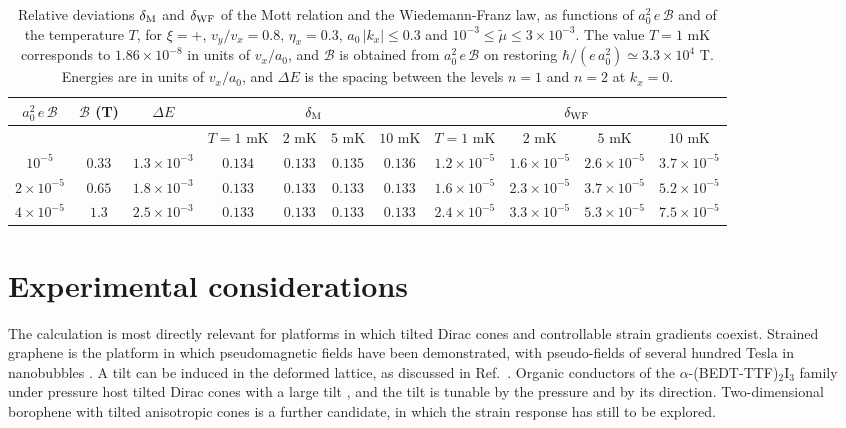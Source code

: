 \documentclass[aps,prb, onecolumn, nofootinbib, citeautoscript,10pt]{revtex4-2}
\begin{document}
\begin{table}[t!]
\centering
\small
\renewcommand{\arraystretch}{1.4}

\begin{tabular}{|c|c|c|c|c|c|c|c|c|c|c|}
\hline
$a_0^2\,e\,\mathcal B$ & $\mathcal B$ (T) & $\Delta E$ & \multicolumn{4}{c|}{$\delta_{\rm M}$} & \multicolumn{4}{c|}{$\delta_{\rm WF}$} \\
\hline
 &  &  & $T=1$ mK & $2$ mK & $5$ mK & $10$ mK & $T=1$ mK & $2$ mK & $5$ mK & $10$ mK \\
\hline
$10^{-5}$ & $0.33$ & $1.3\times10^{-3}$ & $0.134$ & $0.133$ & $0.135$ & $0.136$ & $1.2\times10^{-5}$ & $1.6\times10^{-5}$ & $2.6\times10^{-5}$ & $3.7\times10^{-5}$ \\
\hline
$2\times10^{-5}$ & $0.65$ & $1.8\times10^{-3}$ & $0.133$ & $0.133$ & $0.133$ & $0.133$ & $1.6\times10^{-5}$ & $2.3\times10^{-5}$ & $3.7\times10^{-5}$ & $5.2\times10^{-5}$ \\
\hline
$4\times10^{-5}$ & $1.3$ & $2.5\times10^{-3}$ & $0.133$ & $0.133$ & $0.133$ & $0.133$ & $2.4\times10^{-5}$ & $3.3\times10^{-5}$ & $5.3\times10^{-5}$ & $7.5\times10^{-5}$ \\
\hline
\end{tabular}
\caption{Relative deviations $\delta_{\rm M}$ and $\delta_{\rm WF}$ of the Mott relation and the Wiedemann-Franz law, as functions of $a_0^2\,e\,\mathcal B$ and of the temperature $T$, for $\xi=+$, $v_y/v_x=0.8$, $\eta_x=0.3$, $a_0\,|k_x|\le0.3$ and $10^{-3}\le\tilde\mu\le3\times10^{-3}$. The value $T=1$ mK corresponds to $1.86\times10^{-8}$ in units of $v_x/a_0$, and $\mathcal B$ is obtained from $a_0^2\,e\,\mathcal B$ on restoring $\hbar/(e\,a_0^2)\simeq3.3\times10^{4}$ T. Energies are in units of $v_x/a_0$, and $\Delta E$ is the spacing between the levels $n=1$ and $n=2$ at $k_x=0$.\label{tabdev}}
\end{table}







\section{Experimental considerations}
\label{secexp}

The calculation is most directly relevant for platforms in which tilted Dirac cones and controllable strain gradients coexist. Strained graphene is the platform in which pseudomagnetic fields have been demonstrated, with pseudo-fields of several hundred Tesla in nanobubbles \cite{levy10, graphene-strain-geim, vozmediano10, strain-2d}. A tilt can be induced in the deformed lattice, as discussed in Ref.~\cite{tilted-goerbig}. Organic conductors of the $\alpha$-(BEDT-TTF)$_2$I$_3$ family under pressure host tilted Dirac cones with a large tilt \cite{organic-tilted-dirac}, and the tilt is tunable by the pressure and by its direction. Two-dimensional borophene with tilted anisotropic cones \cite{zhou14} is a further candidate, in which the strain response has still to be explored.
\end{document}
